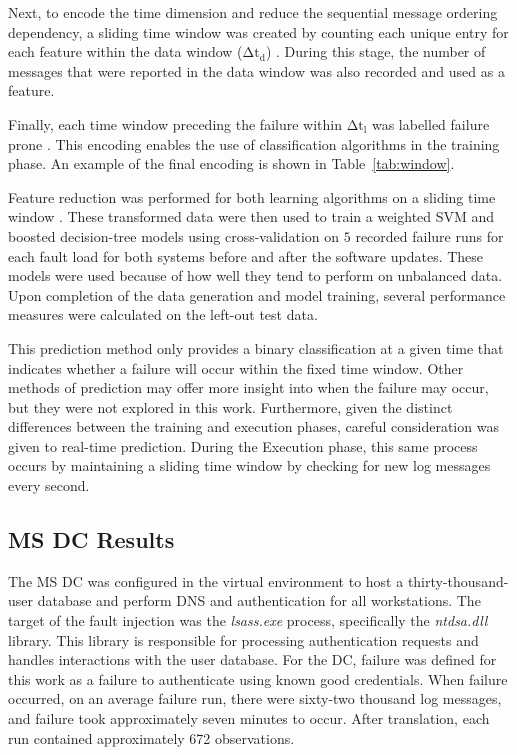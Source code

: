 Next, to encode the time dimension and reduce the sequential message ordering
dependency, a sliding time window was created by counting each unique entry for
each feature within the data window ($\mathrm{\Delta t_d}$)
\citep{vaarandi2002}.  During this stage, the number of messages that were
reported in the data window was also recorded and used as a feature.

Finally, each time window preceding the failure within $\mathrm{\Delta t_l}$
was labelled failure prone \citep{irrera2015}.  This encoding enables the use
of classification algorithms in the training phase.  An example of the final
encoding is shown in Table~\ref{tab:window}.

\tabMessageIDs %
\tabSlidingWindow

Feature reduction was performed for both learning algorithms on a sliding time
window \citep{fulp2008,irrera2013a,vaarandi2002}.  These transformed data were
then used to train a weighted \ac{SVM} and boosted decision-tree models using
cross-validation on $5$ recorded failure runs for each fault load for both
systems before and after the software updates.  These models were used because
of how well they tend to perform on unbalanced data.  Upon completion of the
data generation and model training, several performance measures were
calculated on the left-out test data.

This prediction method only provides a binary classification at a given time
that indicates whether a failure will occur within the fixed time window.
Other methods of prediction may offer more insight into when the failure may
occur, but they were not explored in this work.  Furthermore, given the
distinct differences between the training and execution phases, careful
consideration was given to real-time prediction.  During the Execution phase,
this same process occurs by maintaining a sliding time window by checking for
new log messages every second.

\subsection{\acrfull{MS} \acrfull{DC} Results}
The \ac{MS} \ac{DC} was configured in the virtual environment to host a
thirty-thousand-user database and perform \ac{DNS} and authentication for all
workstations.  The target of the fault injection was the \emph{lsass.exe}
process, specifically the \emph{ntdsa.dll} library.  This library is
responsible for processing authentication requests and handles interactions
with the user database.  For the \ac{DC}, failure was defined for this work as
a failure to authenticate using known good credentials.  When failure occurred,
on an average failure run, there were sixty-two thousand log messages, and
failure took approximately seven minutes to occur.  After translation, each run
contained approximately 672 observations. 


